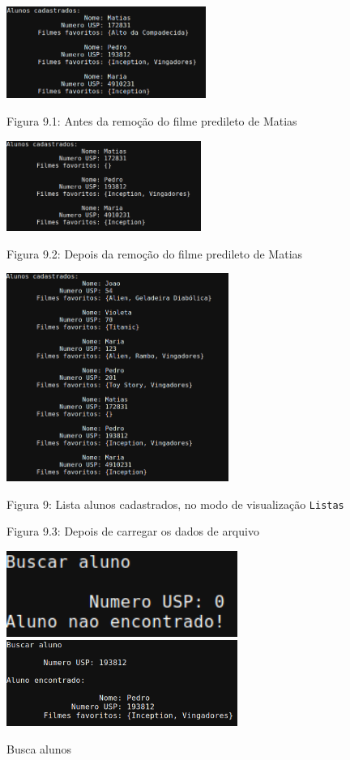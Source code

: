 \documentclass[12pt,a4paper,portuguese]{article}
\begin{document}
        \begin{figure}[H]
            \centering
            \includegraphics[height=3cm]{imgs/lista_alunos_LISTAS_1.png}
            \vspace{-10px}
            \caption*{Figura 9.1: Antes da remoção do filme predileto de Matias}
            \includegraphics[height=2.95cm]{imgs/lista_alunos_LISTAS_2.png}
            \vspace{-10px}
            \caption*{Figura 9.2: Depois da remoção do filme predileto de Matias}
            \includegraphics[height=6.8cm]{imgs/lista_alunos_LISTAS_3.png}
            \vspace{-10px}
            \caption*{Figura 9.3: Depois de carregar os dados de arquivo}
            Figura 9: Lista alunos cadastrados, no modo de visualização \texttt{Listas}
        \end{figure}

        \setcounter{figure}{9}

        \begin{figure}[H]
            \centering
            \includegraphics[height=2.8cm]{imgs/busca_aluno_1.png}
            \includegraphics[height=2.8cm]{imgs/busca_aluno_2.png}
            \caption{Busca alunos}
        \end{figure}
\end{document}
